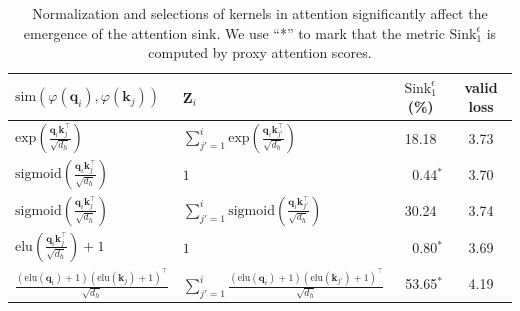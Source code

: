 
\begin{table}[t]
\vspace{-1.1cm}
\caption{Normalization and selections of kernels in attention significantly affect the emergence of the attention sink. We use ``*'' to mark that the metric $\textrm{Sink}_1^{\epsilon}$ is computed by proxy attention scores.}
\vspace{-.2cm}
\begin{center}
\begin{tabular}{l|l|cc}
\toprule
  $\textrm{sim}(\varphi(\boldsymbol{q}_i)\textrm{,}\,\varphi(\boldsymbol{k}_j))$ & $\boldsymbol{Z}_i$ & $\textrm{Sink}_1^{\epsilon}$(\%) & valid loss \\
\midrule
 $\textrm{exp}(\frac{\boldsymbol{q}_i\boldsymbol{k}_j^\top}{\sqrt{d_h}})$ & $\sum_{j'=1}^i \textrm{exp}(\frac{\boldsymbol{q}_i\boldsymbol{k}_{j'}^\top}{\sqrt{d_h}})$ & 18.18 & 3.73 \\
 $\textrm{sigmoid}(\frac{\boldsymbol{q}_i\boldsymbol{k}_j^\top}{\sqrt{d_h}})$ & $1$ & \,\,\,\,\,\,0.44$^*$ &  3.70 \\
$\textrm{sigmoid}(\frac{\boldsymbol{q}_i\boldsymbol{k}_j^\top}{\sqrt{d_h}})$ & $\sum_{j'=1}^i \textrm{sigmoid}(\frac{\boldsymbol{q}_i\boldsymbol{k}_{j'}^\top}{\sqrt{d_h}})$ & 30.24 & 3.74 \\
 $\textrm{elu}(\frac{\boldsymbol{q}_i\boldsymbol{k}_j^\top}{\sqrt{d_h}})+1$ & $1$ & \,\,\,\,\,\,0.80$^*$ &  3.69 \\ 
 \midrule
$\frac{(\textrm{elu}(\boldsymbol{q}_i)+1)(\textrm{elu}(\boldsymbol{k}_j)+1)^\top}{\sqrt{d_h}}$ & $\sum_{j'=1}^i\frac{(\textrm{elu}(\boldsymbol{q}_i)+1)(\textrm{elu}(\boldsymbol{k}_{j'})+1)^\top}{\sqrt{d_h}}$ & \,\,\,53.65$^*$ & 4.19\\ 

\end{tabular}
\end{center}
\end{table}
